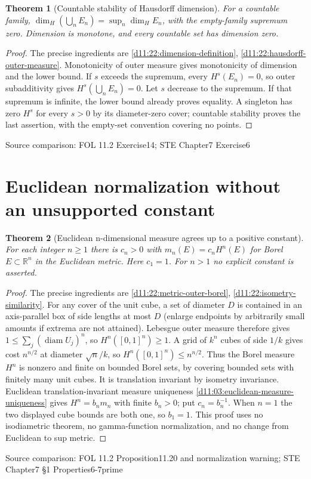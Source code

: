 \documentclass[11pt,oneside,openany]{book}
\newtheorem{theorem}{Theorem}[chapter]
\theoremstyle{definition}
\theoremstyle{remark}
\newcommand{\R}{\mathbb R}\newcommand{\C}{\mathbb C}
\DeclareMathOperator{\diam}{diam}\DeclareMathOperator{\dist}{dist}
\newcommand{\family}[1]{}
\newcommand{\source}[1]{\par\begingroup\small\sffamily\color{black!65}Source comparison: #1\par\endgroup}
\begin{document}
\begin{theorem}[Countable stability of Hausdorff dimension]\family{D11.22.countable_stability}\label{d11:22:countable-stability}
For a countable family, $\dim_H(\bigcup_nE_n)=\sup_n\dim_HE_n$, with the empty-family supremum zero. Dimension is monotone, and every countable set has dimension zero.
\end{theorem}
\begin{proof}
The precise ingredients are \cref{d11:22:dimension-definition}, \cref{d11:22:hausdorff-outer-measure}. Monotonicity of outer measure gives monotonicity of dimension and the lower bound. If $s$ exceeds the supremum, every $H^s(E_n)=0$, so outer subadditivity gives $H^s(\bigcup_nE_n)=0$. Let $s$ decrease to the supremum. If that supremum is infinite, the lower bound already proves equality. A singleton has zero $H^s$ for every $s>0$ by its diameter-zero cover; countable stability proves the last assertion, with the empty-set convention covering no points.
\end{proof}
\source{FOL 11.2 Exercise14; STE Chapter7 Exercise6}

\section{Euclidean normalization without an unsupported constant}

\begin{theorem}[Euclidean n-dimensional measure agrees up to a positive constant]\family{D11.22.euclidean_lebesgue_normalization}\label{d11:22:euclidean-lebesgue-normalization}
For each integer $n\ge1$ there is $c_n>0$ with $m_n(E)=c_nH^n(E)$ for Borel $E\subset\R^n$ in the Euclidean metric. Here $c_1=1$. For $n>1$ no explicit constant is asserted.
\end{theorem}
\begin{proof}
The precise ingredients are \cref{d11:22:metric-outer-borel}, \cref{d11:22:isometry-similarity}. For any cover of the unit cube, a set of diameter $D$ is contained in an axis-parallel box of side lengths at most $D$ (enlarge endpoints by arbitrarily small amounts if extrema are not attained). Lebesgue outer measure therefore gives $1\le\sum_j(\diam U_j)^n$, so $H^n([0,1]^n)\ge1$. A grid of $k^n$ cubes of side $1/k$ gives cost $n^{n/2}$ at diameter $\sqrt n/k$, so $H^n([0,1]^n)\le n^{n/2}$. Thus the Borel measure $H^n$ is nonzero and finite on bounded Borel sets, by covering bounded sets with finitely many unit cubes. It is translation invariant by isometry invariance. Euclidean translation-invariant measure uniqueness \cref{d11:03:euclidean-measure-uniqueness} gives $H^n=b_nm_n$ with finite $b_n>0$; put $c_n=b_n^{-1}$. When $n=1$ the two displayed cube bounds are both one, so $b_1=1$. This proof uses no isodiametric theorem, no gamma-function normalization, and no change from Euclidean to sup metric.
\end{proof}
\source{FOL 11.2 Proposition11.20 and normalization warning; STE Chapter7 §1 Properties6-7prime}
\end{document}
